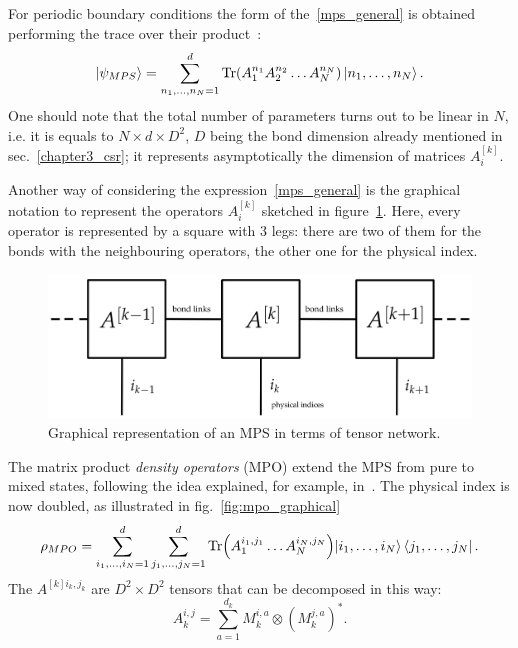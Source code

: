 For periodic boundary conditions the form of the~\ref{mps_general} is obtained performing the trace over their product~\cite{SCHOLLWOCK201196, PhysRevLett.93.207204}:
\begin{equation}
    \ket{\psi_{MPS}} = \sum_{n_1,\dots,n_N=1}^{d} \operatorname{Tr}(A_1^{n_1}A_2^{n_2}\dots A_N^{n_N}) \ket{n_1,\dots,n_N}.
\end{equation}
One should note that the total number of parameters turns out to be linear in $N$, i.e. it is equals to $N \times d \times D^2$, $D$ being the bond dimension already mentioned in sec.~\ref{chapter3_csr}; it represents asymptotically the dimension of matrices $A_i^{[k]}$.

Another way of considering the expression~\ref{mps_general} is the graphical notation to represent the operators $A^{[k]}_i$ sketched in figure~\ref{fig:mps_graphical}. Here, every operator is represented by a square with 3 legs: there are two of them for the bonds with the neighbouring operators, the other one for the physical index. 

\begin{figure}[H]
    \centering
    \includegraphics[scale=0.4]{Figures/mps_graphical.png}
    \captionsetup{width=1.\linewidth}
    \caption{Graphical representation of an MPS in terms of tensor network.}
    \label{fig:mps_graphical}
\end{figure}

The matrix product \emph{density operators} (MPO) extend the MPS from pure to mixed states, following the idea explained, for example, in~\cite{PhysRevLett.93.207204}. The physical index is now doubled, as illustrated in fig.~\ref{fig:mpo_graphical}
\begin{equation}
\label{eqn:mpdo}
    \rho_{MPO} = \sum_{i_1, \dots ,i_N = 1}^{d} \sum_{j_1, \dots ,j_N = 1}^{d} \operatorname{Tr}\Bigl(A_1^{i_1,j_1} \dots A_N^{i_N,j_N}\Bigl) \ket{i_1, \dots ,i_N}\bra{j_1, \dots ,j_N}.
\end{equation}
The $A^{[k]i_k,j_k}$ are $D^2 \times D^2$ tensors that can be decomposed in this way:
\begin{equation*}
    A_k^{i,j} = \sum_{a = 1}^{d_k} M_k^{i,a} \otimes (M_k^{j,a})^*.
\end{equation*}

